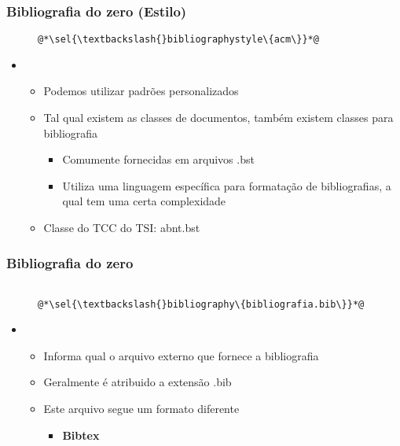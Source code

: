 \begin{frame}[fragile] \frametitle{Bibliografia do zero (Estilo)}
\begin{figure}[!t]
\begin{lstlisting}
@*\sel{\textbackslash{}bibliographystyle\{acm\}}*@

\end{lstlisting}
\end{figure}

\begin{itemize}
	\item {}
	\begin{itemize}
		\item Podemos utilizar padrões personalizados
		\item Tal qual existem as classes de documentos, também existem classes para bibliografia
		\begin{itemize}
			\item Comumente fornecidas em arquivos .bst
			\item Utiliza uma linguagem específica para formatação de bibliografias, a qual tem uma certa complexidade
		\end{itemize}
		\item Classe do TCC do TSI: abnt.bst
	\end{itemize}
\end{itemize}
\end{frame}

\begin{frame}[fragile] \frametitle{Bibliografia do zero}
\begin{figure}[!t]
\begin{lstlisting}

@*\sel{\textbackslash{}bibliography\{bibliografia.bib\}}*@
\end{lstlisting}
\end{figure}

\begin{itemize}
	\item {}
	\begin{itemize}
		\item Informa qual o arquivo externo que fornece a bibliografia
		\item Geralmente é atribuido a extensão .bib
		\item Este arquivo segue um formato diferente
		\begin{itemize}
			\item \textbf{Bibtex}
		\end{itemize}
	\end{itemize}
\end{itemize}
\end{frame}

